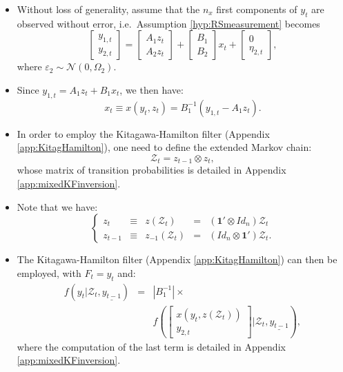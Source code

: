 \documentclass[
  12pt,
]{book}
\providecommand{\tightlist}{%
  \setlength{\itemsep}{0pt}\setlength{\parskip}{0pt}}
\theoremstyle{definition}
\theoremstyle{definition}
\theoremstyle{definition}
\theoremstyle{definition}
\theoremstyle{remark}
\begin{document}
\begin{itemize}
\tightlist
\item
  Without loss of generality, assume that the \(n_x\) first components of \(y_t\) are observed without error, i.e.~Assumption \ref{hyp:RSmeasurement} becomes
  \[
  \left[
  \begin{array}{c}
  y_{1,t}\\
  y_{2,t}
  \end{array}
  \right]
  =
  \left[
  \begin{array}{c}
  A_{1}z_t\\
  A_{2}z_t
  \end{array}
  \right]+
  \left[
  \begin{array}{c}
  B_{1}\\
  B_{2}
  \end{array}
  \right]x_t +
  \left[
  \begin{array}{c}
  0\\
  \eta_{2,t}
  \end{array}
  \right],
  \]
  where \(\varepsilon_2 \sim \mathcal{N}(0,\Omega_2)\).
\item
  Since \(y_{1,t} = A_1 z_t + B_1 x_t\), we then have:
  \begin{equation}
  x_t \equiv x(y_{t},z_t) = B_1^{-1}(y_{1,t} - A_1 z_t).\label{eq:xRS}
  \end{equation}
\item
  In order to employ the Kitagawa-Hamilton filter (Appendix \ref{app:KitagHamilton}), one need to define the extended Markov chain:
  \[
  \mathcal{Z}_t = z_{t-1} \otimes z_t,
  \]
  whose matrix of transition probabilities is detailed in Appendix \ref{app:mixedKFinversion}.
\item
  Note that we have:
  \[
  \left\{
  \begin{array}{cclll}
  z_t &\equiv& z(\mathcal{Z}_t) &=& (\mathbf{1}' \otimes Id_{n}) \mathcal{Z}_t \\
  z_{t-1} &\equiv& z_{-1}(\mathcal{Z}_t) &=& (Id_{n} \otimes \mathbf{1}') \mathcal{Z}_t.
  \end{array}
  \right.
  \]
\item
  The Kitagawa-Hamilton filter (Appendix \ref{app:KitagHamilton}) can then be employed, with \(F_t = y_t\) and:
  \begin{eqnarray}
  f(y_t|\mathcal{Z}_t,\underline{y_{t-1}}) &=&|B_1^{-1}| \times \nonumber \\
  && f\left(\left[\begin{array}{c}x(y_t,z(\mathcal{Z}_t))\\ y_{2,t}\end{array}\right]|\mathcal{Z}_t,\underline{y_{t-1}}\right),\label{eq:conddistri4KHfilter}
  \end{eqnarray}
  where the computation of the last term is detailed in Appendix \ref{app:mixedKFinversion}.
\end{itemize}
\end{document}
